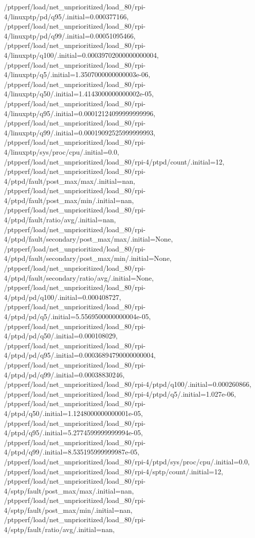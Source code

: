 {    /ptpperf/load/net_unprioritized/load_80/rpi-4/linuxptp/pd/q95/.initial=0.000377166,
    /ptpperf/load/net_unprioritized/load_80/rpi-4/linuxptp/pd/q99/.initial=0.00051095466,
    /ptpperf/load/net_unprioritized/load_80/rpi-4/linuxptp/q100/.initial=0.00039702000000000004,
    /ptpperf/load/net_unprioritized/load_80/rpi-4/linuxptp/q5/.initial=1.3507000000000003e-06,
    /ptpperf/load/net_unprioritized/load_80/rpi-4/linuxptp/q50/.initial=1.4143000000000002e-05,
    /ptpperf/load/net_unprioritized/load_80/rpi-4/linuxptp/q95/.initial=0.00012124099999999996,
    /ptpperf/load/net_unprioritized/load_80/rpi-4/linuxptp/q99/.initial=0.00019092525999999993,
    /ptpperf/load/net_unprioritized/load_80/rpi-4/linuxptp/sys/proc/cpu/.initial=0.0,
    /ptpperf/load/net_unprioritized/load_80/rpi-4/ptpd/count/.initial=12,
    /ptpperf/load/net_unprioritized/load_80/rpi-4/ptpd/fault/post_max/max/.initial=nan,
    /ptpperf/load/net_unprioritized/load_80/rpi-4/ptpd/fault/post_max/min/.initial=nan,
    /ptpperf/load/net_unprioritized/load_80/rpi-4/ptpd/fault/ratio/avg/.initial=nan,
    /ptpperf/load/net_unprioritized/load_80/rpi-4/ptpd/fault/secondary/post_max/max/.initial=None,
    /ptpperf/load/net_unprioritized/load_80/rpi-4/ptpd/fault/secondary/post_max/min/.initial=None,
    /ptpperf/load/net_unprioritized/load_80/rpi-4/ptpd/fault/secondary/ratio/avg/.initial=None,
    /ptpperf/load/net_unprioritized/load_80/rpi-4/ptpd/pd/q100/.initial=0.000408727,
    /ptpperf/load/net_unprioritized/load_80/rpi-4/ptpd/pd/q5/.initial=5.5569500000000004e-05,
    /ptpperf/load/net_unprioritized/load_80/rpi-4/ptpd/pd/q50/.initial=0.000108029,
    /ptpperf/load/net_unprioritized/load_80/rpi-4/ptpd/pd/q95/.initial=0.00036894790000000004,
    /ptpperf/load/net_unprioritized/load_80/rpi-4/ptpd/pd/q99/.initial=0.00038830246,
    /ptpperf/load/net_unprioritized/load_80/rpi-4/ptpd/q100/.initial=0.000260866,
    /ptpperf/load/net_unprioritized/load_80/rpi-4/ptpd/q5/.initial=1.027e-06,
    /ptpperf/load/net_unprioritized/load_80/rpi-4/ptpd/q50/.initial=1.1248000000000001e-05,
    /ptpperf/load/net_unprioritized/load_80/rpi-4/ptpd/q95/.initial=5.2774599999999994e-05,
    /ptpperf/load/net_unprioritized/load_80/rpi-4/ptpd/q99/.initial=8.535195999999987e-05,
    /ptpperf/load/net_unprioritized/load_80/rpi-4/ptpd/sys/proc/cpu/.initial=0.0,
    /ptpperf/load/net_unprioritized/load_80/rpi-4/sptp/count/.initial=12,
    /ptpperf/load/net_unprioritized/load_80/rpi-4/sptp/fault/post_max/max/.initial=nan,
    /ptpperf/load/net_unprioritized/load_80/rpi-4/sptp/fault/post_max/min/.initial=nan,
    /ptpperf/load/net_unprioritized/load_80/rpi-4/sptp/fault/ratio/avg/.initial=nan,
}
